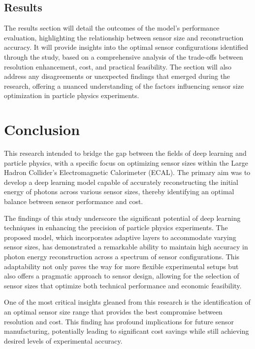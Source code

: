 \documentclass[conference]{IEEEtran}
\begin{document}
\subsection{Results}\label{main_body:results}

The results section will detail the outcomes of the model's performance evaluation, highlighting the relationship between sensor size and reconstruction accuracy. It will provide insights into the optimal sensor configurations identified through the study, based on a comprehensive analysis of the trade-offs between resolution enhancement, cost, and practical feasibility. The section will also address any disagreements or unexpected findings that emerged during the research, offering a nuanced understanding of the factors influencing sensor size optimization in particle physics experiments.

\section{Conclusion}\label{conclusion}

This research intended to bridge the gap between the fields of deep learning and particle physics, with a specific focus on optimizing sensor sizes within the Large Hadron Collider's Electromagnetic Calorimeter (ECAL). The primary aim was to develop a deep learning model capable of accurately reconstructing the initial energy of photons across various sensor sizes, thereby identifying an optimal balance between sensor performance and cost.

The findings of this study underscore the significant potential of deep learning techniques in enhancing the precision of particle physics experiments. The proposed model, which incorporates adaptive layers to accommodate varying sensor sizes, has demonstrated a remarkable ability to maintain high accuracy in photon energy reconstruction across a spectrum of sensor configurations. This adaptability not only paves the way for more flexible experimental setups but also offers a pragmatic approach to sensor design, allowing for the selection of sensor sizes that optimize both technical performance and economic feasibility.

One of the most critical insights gleaned from this research is the identification of an optimal sensor size range that provides the best compromise between resolution and cost. This finding has profound implications for future sensor manufacturing, potentially leading to significant cost savings while still achieving desired levels of experimental accuracy.
\end{document}
